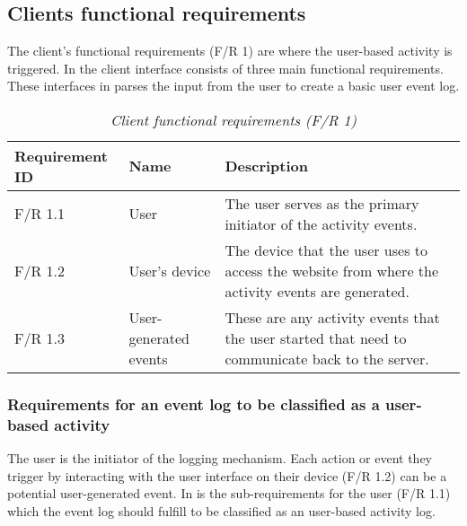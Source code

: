 \clearpage

\subsection{Clients functional requirements}

The client's functional requirements (F/R 1) are where the user-based activity is triggered. In  the client interface consists of three main functional requirements. These interfaces in  parses the input from the user to create a basic user event log. 

\begin{table}[!htb]
	\centering
	\small
	\caption[Client functional requirements]
	{\textit{Client functional requirements (F/R 1)}}
	\label{tbl:Ch2_Client_Functional_Requirements}
	\begin{tabularx}{\textwidth}{|l|l|X|}
		\hline \textbf{Requirement ID} & \textbf{Name} & \textbf{Description} \\
		\hline F/R 1.1 & User & The user serves as the primary initiator of the activity events.\\
		\hline F/R 1.2 & User's device & The device that the user uses to access the website from where the activity events are generated.\\
		\hline F/R 1.3 & User-generated events & These are any activity events that the user started that need to communicate back to the server.\\
		\hline
	\end{tabularx}
\end{table}

\subsubsection{Requirements for an event log to be classified as a user-based activity}
The user is the initiator of the logging mechanism. Each action or event they trigger by interacting with the user interface on their device (F/R 1.2) can be a potential user-generated event. In  is the sub-requirements for the user (F/R 1.1) which the event log should fulfill to be classified as an user-based activity log.

